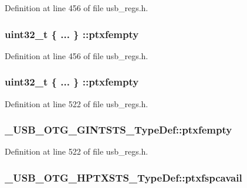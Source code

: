 Definition at line 456 of file usb\-\_\-regs.\-h.

\hypertarget{group___u_s_b___o_t_g___d_r_i_v_e_r_gad7f30f35838fb02da8f8cc0e1a6a1d21}{
\subsubsection[{ptxfempty}]{\setlength{\rightskip}{0pt plus 5cm}uint32\-\_\-t \{ ... \} \-::ptxfempty}}\label{group___u_s_b___o_t_g___d_r_i_v_e_r_gad7f30f35838fb02da8f8cc0e1a6a1d21}


Definition at line 456 of file usb\-\_\-regs.\-h.

\hypertarget{group___u_s_b___o_t_g___d_r_i_v_e_r_ga13360e6fc7a311364708ae88e0e0022e}{
\subsubsection[{ptxfempty}]{\setlength{\rightskip}{0pt plus 5cm}uint32\-\_\-t \{ ... \} \-::ptxfempty}}\label{group___u_s_b___o_t_g___d_r_i_v_e_r_ga13360e6fc7a311364708ae88e0e0022e}


Definition at line 522 of file usb\-\_\-regs.\-h.

\hypertarget{group___u_s_b___o_t_g___d_r_i_v_e_r_gad248f65c7426067defbfcfd1b8d41ece}{
\subsubsection[{ptxfempty}]{ \-\_\-\-U\-S\-B\-\_\-\-O\-T\-G\-\_\-\-G\-I\-N\-T\-S\-T\-S\-\_\-\-Type\-Def\-::ptxfempty}}\label{group___u_s_b___o_t_g___d_r_i_v_e_r_gad248f65c7426067defbfcfd1b8d41ece}


Definition at line 522 of file usb\-\_\-regs.\-h.

\hypertarget{group___u_s_b___o_t_g___d_r_i_v_e_r_gac17dfee021a7eb4609cb89ca945f7c21}{
\subsubsection[{ptxfspcavail}]{ \-\_\-\-U\-S\-B\-\_\-\-O\-T\-G\-\_\-\-H\-P\-T\-X\-S\-T\-S\-\_\-\-Type\-Def\-::ptxfspcavail}}\label{group___u_s_b___o_t_g___d_r_i_v_e_r_gac17dfee021a7eb4609cb89ca945f7c21}


